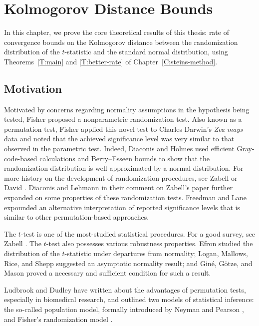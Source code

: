 \chapter{Kolmogorov Distance Bounds}
\label{C:stein-proof} In this chapter, we prove the core theoretical
results of this thesis: rate of convergence bounds on the Kolmogorov
distance between the randomization distribution of the $t$-statistic
and the standard normal distribution, using
Theorems~\ref{T:main} and \ref{T:better-rate} of Chapter~\ref{C:steins-method}.

\section{Motivation}
Motivated by concerns regarding normality assumptions in the
hypothesis being tested, Fisher \cite{fisher1935design} proposed a
nonparametric randomization test.  Also known as a permutation test,
Fisher applied this novel test to Charles Darwin's \emph{Zea mays}
data and noted that the achieved significance level was very similar
to that observed in the parametric test.  Indeed, Diaconis and Holmes
\cite{diaconis1994gray} used efficient Gray-code-based calculations
and Berry--Esseen bounds to show that the randomization distribution
is well approximated by a normal distribution.  For more history on
the development of randomization procedures, see Zabell
\cite{zabell2008student} or David \cite{david2008beginnings}.
Diaconis and Lehmann \cite{diaconis2008comment} in their comment on
Zabell's paper further expanded on some properties of these
randomization tests.  Freedman and Lane
\cite{freedman1983nonstochastic} expounded an alternative
interpretation of reported significance levels that is similar to
other permutation-based approaches.

The $t$-test is one of the most-studied statistical procedures.  For a
good survey, see Zabell \cite{zabell2008student}.  The $t$-test also
possesses various robustness properties.  Efron \cite{efron1969student}
studied the distribution of the $t$-statistic under departures from
normality; Logan, Mallows, Rice, and Shepp \cite{logan1973limit} suggested
an asymptotic normality result; and Gin\'e, G\"otze, and Mason \cite{MR1457629}
proved a necessary and sufficient condition for such a result.

Ludbrook and Dudley \cite{ludbrook1998permutation} have written about
the advantages of permutation tests, especially in biomedical
research, and outlined two models of statistical inference: the
so-called population model, formally introduced by Neyman and Pearson
\cite{neyman1928use}, and Fisher's randomization model
\cite{fisher1935design}.

